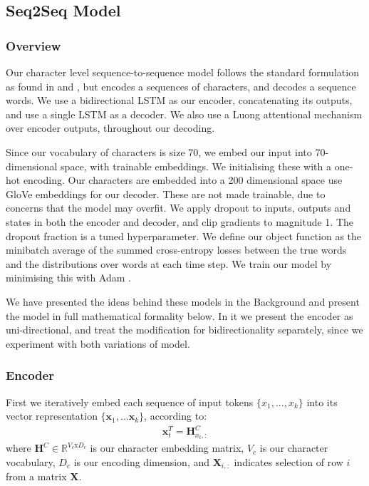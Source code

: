 
\subsection{Seq2Seq Model} %
\label{sec:character_level_sequence_to_sequence}

\subsubsection{Overview}

Our character level sequence-to-sequence model follows the standard formulation as found in \citet{sutskever_sequence_2014} and \citet{bahdanau_neural_2014}, but encodes a sequences of characters, and decodes a sequence words. 
We use a bidirectional LSTM as our encoder, concatenating its outputs\citep{bahdanau_neural_2014}, and use a single LSTM as a decoder.
We also use a Luong attentional mechanism \citep{luong_effective_2015} over encoder outputs, throughout our decoding.

Since our vocabulary of characters is size 70, we embed our input into 70-dimensional space, with trainable embeddings. We initialising these with a one-hot encoding.
Our characters are embedded into a 200 dimensional space use GloVe embeddings for our decoder. 
These are not made trainable, due to concerns that the model may overfit. 
We apply dropout \citep{srivastava_dropout_nodate} to inputs, outputs and states in both the encoder and decoder, and clip gradients to magnitude 1. The dropout fraction is a tuned hyperparameter.
We define our object function as the minibatch average of the summed cross-entropy losses between the true words and the distributions over words at each time step.
We train our model by minimising this with Adam \citep{kingma2014adam}. 

We have presented the ideas behind these models in the Background and present the model in full mathematical formality below. In it we present the encoder as uni-directional, and treat the modification for bidirectionality separately, since we experiment with both variations of model.

\subsubsection{Encoder}

First we iteratively embed each sequence of input tokens $\{x_1,...,x_k\}$ into its vector representation $\{\textbf{x}_1,...\textbf{x}_k\}$, according to:
\begin{align}
    \textbf{x}^T_t = \mathbf{H}^C_{x_t,:}
\end{align}
where 
$\textbf{H}^C \in \mathbb{R}^{V_c\text{x}D_c}$ is our character embedding matrix, 
$V_c$ is our character vocabulary, 
$D_c$ is our encoding dimension, 
and $\textbf{X}_{i,:}$ indicates selection of row $i$ from a matrix \textbf{X}.

